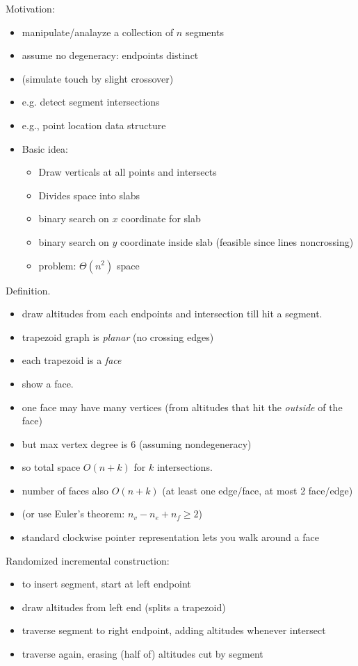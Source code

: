 \documentclass{article}
\begin{document}
Motivation: 
\begin{itemize}
\item manipulate/analayze a collection of $n$ segments
\item assume no degeneracy: endpoints distinct
\item (simulate touch by slight crossover)
\item e.g. detect segment intersections
\item e.g., point location data structure
\item Basic idea:
\begin{itemize}
\item Draw verticals at all points and intersects
\item Divides space into slabs
\item binary search on $x$ coordinate for slab
\item binary search on $y$ coordinate inside slab (feasible since
  lines noncrossing)
\item problem: $\Theta(n^2)$ space
\end{itemize}
\end{itemize}

Definition.
\begin{itemize}
\item draw altitudes from each endpoints and intersection till hit a segment.
\item trapezoid graph is \emph{planar} (no crossing edges)
\item each trapezoid is a \emph{face}
\item show a face.  
\item one face may have many vertices (from altitudes that hit the
  \emph{outside} of the face)
\item but max vertex degree is 6 (assuming nondegeneracy)
\item so total space $O(n+k)$ for $k$ intersections.
\item number of faces also $O(n+k)$ (at least one edge/face, at most 2
  face/edge)
\item (or use Euler's theorem: $n_v-n_e+n_f \ge 2$)
\item standard clockwise pointer representation lets you walk around a face
\end{itemize}

Randomized incremental construction:
\begin{itemize}
\item to insert segment, start at left endpoint
\item draw altitudes from left end (splits a trapezoid)
\item traverse segment to right endpoint, adding altitudes whenever
  intersect 
\item traverse again, erasing (half of) altitudes cut by segment
\end{itemize}
\end{document}
